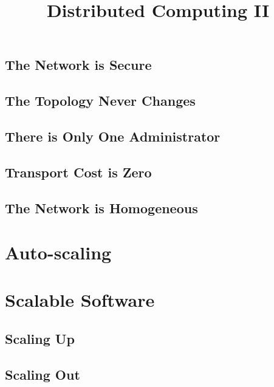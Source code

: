 \subsection{The Network is Secure}

\subsection{The Topology Never Changes}

\subsection{There is Only One Administrator}

\subsection{Transport Cost is Zero}

\subsection{The Network is Homogeneous}

\section{Auto-scaling}



\pagebreak

\title{Distributed Computing II}
\date{}

\maketitle

\section{Scalable Software}

\subsection{Scaling Up}

\subsection{Scaling Out}

